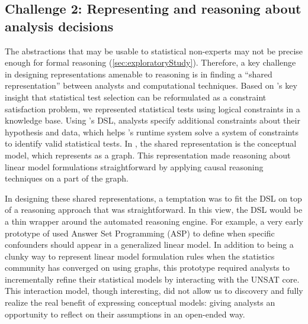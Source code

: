 \subsection{Challenge 2: Representing and reasoning about analysis decisions}
The abstractions that may be usable to statistical non-experts may not be
precise enough for formal reasoning (\autoref{sec:exploratoryStudy}). Therefore,
a key challenge in designing representations amenable to reasoning is in finding
a ``shared representation'' between analysts and computational techniques. Based
on \tea's key insight that statistical test selection can be reformulated as a
constraint satisfaction problem, we represented statistical tests using logical
constraints in a knowledge base. Using \tea's DSL, analysts specify additional
constraints about their hypothesis and data, which helps \tea's runtime system
solve a system of constraints to identify valid statistical tests. In \tisane,
the shared representation is the conceptual model, which \tisane represents as a
graph. This representation made reasoning about linear model formulations
straightforward by applying causal reasoning techniques on a part of the graph. 

In designing these shared representations, a temptation was to fit the DSL on
top of a reasoning approach that was straightforward. In this view, the DSL
would be a thin wrapper around the automated reasoning engine. For example, a
very early prototype of \tisane used Answer Set Programming (ASP) to define when
specific confounders should appear in a generalized linear model. In addition to
being a clunky way to represent linear model formulation rules when the
statistics community has converged on using graphs, this prototype required
analysts to incrementally refine their statistical models by interacting with
the UNSAT core. This interaction model, though interesting, did not allow us to
discovery and fully realize the real benefit of expressing conceptual models:
giving analysts an opportunity to reflect on their assumptions in an open-ended
way. 

